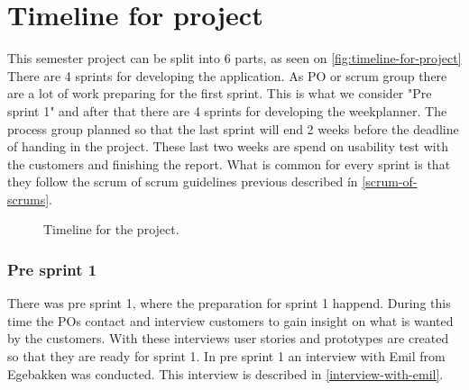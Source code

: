\section{Timeline for project}
This semester project can be split into 6 parts, as seen on \autoref{fig:timeline-for-project}
There are 4 sprints for developing the application. 
As PO or scrum group there are a lot of work preparing for the first sprint.
This is what we consider "Pre sprint 1" and after that there are 4 sprints for developing the weekplanner.
The process group planned so that the last sprint will end 2 weeks before the deadline of handing in the project.
These last two weeks are spend on usability test with the customers and finishing the report.
What is common for every sprint is that they follow the scrum of scrum guidelines previous described ín \autoref{scrum-of-scrums}.

\begin{figure}[H]
    \caption{\label{fig:timeline-for-project} Timeline for the project.}
\end{figure}


\subsubsection{Pre sprint 1}
There was pre sprint 1, where the preparation for sprint 1 happend.
During this time the POs contact and interview customers to gain insight on what is wanted by the customers.
With these interviews user stories and prototypes are created so that they are ready for sprint 1.
In pre sprint 1 an interview with Emil from Egebakken was conducted. 
This interview is described in \autoref{interview-with-emil}.


